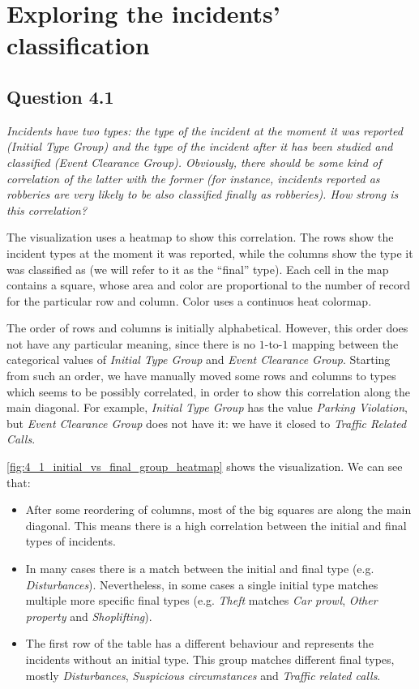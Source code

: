 \section{Exploring the incidents' classification}

\subsection*{Question 4.1}
\textit{Incidents have two types: the type of the incident at the moment it was reported (Initial Type Group) and the type of the incident after it has been studied and classified (Event Clearance Group). Obviously, there should be some kind of correlation of the latter with the former (for instance, incidents reported as robberies are very likely to be also classified finally as robberies). How strong is this correlation?}

The visualization uses a heatmap to show this correlation.
The rows show the incident types at the moment it was reported, while the columns show the type it was classified as (we will refer to it as the ``final'' type).
Each cell in the map contains a square, whose area and color are proportional to the number of record for the particular row and column.
Color uses a continuos heat colormap.

The order of rows and columns is initially alphabetical.
However, this order does not have any particular meaning, since there is no $1$-to-$1$ mapping between the categorical values of \textit{Initial Type Group} and \textit{Event Clearance Group}.
Starting from such an order, we have manually moved some rows and columns to types which seems to be possibly correlated, in order to show this correlation along the main diagonal.
For example, \textit{Initial Type Group} has the value \textit{Parking Violation}, but \textit{Event Clearance Group} does not have it:
we have it closed to \textit{Traffic Related Calls}.

\cref{fig:4_1_initial_vs_final_group_heatmap} shows the visualization.
We can see that:
\begin{itemize}
    \item After some reordering of columns, most of the big squares are along the main diagonal. This means there is a high correlation between the initial and final types of incidents.
    \item In many cases there is a match between the initial and final type (e.g. \textit{Disturbances}). Nevertheless, in some cases a single initial type matches multiple more specific final types (e.g. \textit{Theft} matches \textit{Car prowl}, \textit{Other property} and \textit{Shoplifting}).
    \item The first row of the table has a different behaviour and represents the incidents without an initial type. This group matches different final types, mostly \textit{Disturbances}, \textit{Suspicious circumstances} and \textit{Traffic related calls}.
\end{itemize}

